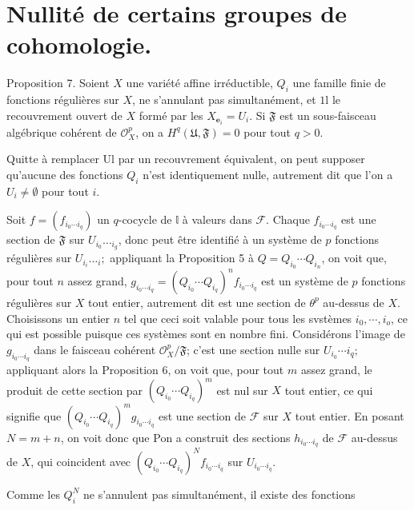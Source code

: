 \section{Nullité de certains groupes de cohomologie.}

Proposition 7. Soient $X$ une variété affine irréductible, $Q_{i}$ une famille finie de fonctions régulières sur $X$, ne s'annulant pas simultanément, et $1 \mathrm{l}$ le recouvrement ouvert de $X$ formé par les $X_{\boldsymbol{e}_{i}}=U_{i} .$ Si $\mathfrak{F}$ est un sous-faisceau algébrique cohérent de $\mathcal{O}_{X}^{p}$, on a $H^{q}(\mathfrak{U}, \mathfrak{F})=0$ pour tout $q>0$.

Quitte à remplacer Ul par un recouvrement équivalent, on peut supposer qu'aucune des fonctions $Q_{i}$ n'est identiquement nulle, autrement dit que l'on a $U_{i} \neq \emptyset$ pour tout $i$.

Soit $f=\left(f_{i_{0} \cdots i_{q}}\right)$ un $q$-cocycle de $\mathbb{l}$ à valeurs dans $\mathcal{F} .$ Chaque $f_{i_{0} \cdots i_{q}}$ est une section de $\mathfrak{F}$ sur $U_{i_{0}} \ldots_{i_{g}}$, donc peut être identifié à un système de $p$ fonctions régulières sur $U_{i_{i}} \ldots_{i} ;$ appliquant la Proposition 5 à $Q=Q_{i_{0}} \cdots Q_{i_{n}}$, on voit que, pour tout $n$ assez grand, $g_{i_{0} \cdots i_{q}}=\left(Q_{i_{0}} \cdots Q_{i_{q}}\right)^{n} f_{i_{0} \cdots i_{q}}$ est un système de $p$ fonctions régulières sur $X$ tout entier, autrement dit est une section de $\theta^{p}$ au-dessus de $X$. Choisissons un entier $n$ tel que ceci soit valable pour tous les svstèmes $i_{0}, \cdots, i_{o}$, ce qui est possible puisque ces systèmes sont en nombre fini. Considérons l'image de $g_{i_{0} \cdots i_{q}}$ dans le faisceau cohérent $\mathcal{O}_{X}^{p} / \mathfrak{F}$; c'est une section nulle sur $U_{i_{0}} \cdots i_{q} ;$ appliquant alors la Proposition 6, on voit que, pour tout $m$ assez grand, le produit de cette section par $\left(Q_{i_{0}} \cdots Q_{i_{q}}\right)^{m}$ est nul sur $X$ tout entier, ce qui signifie que $\left(Q_{i_{0}} \cdots Q_{i_{q}}\right)^{m} g_{i_{0} \cdots i_{q}}$ est une section de $\mathcal{F}$ sur $X$ tout entier. En posant $N=m+n$, on voit donc que Pon a construit des sections $h_{i_{0} \cdots i_{q}}$ de $\mathcal{F}$ au-dessus de $X$, qui coincident avec $\left(Q_{i_{0}} \cdots Q_{i_{q}}\right)^{N} f_{i_{0} \cdots i_{q}}$ sur $U_{i_{0} \cdots i_{q}}$.

Comme les $Q_{i}^{N}$ ne s'annulent pas simultanément, il existe des fonctions

